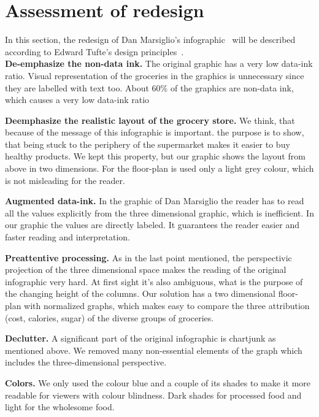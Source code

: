 \section{Assessment of redesign}

In this section, the redesign of Dan Marsiglio's
infographic~\cite{DanMarsigliotwo008} will be described according to Edward
Tufte's design principles~\cite{Tuftetwo001}.\\

\textbf{De-emphasize the non-data ink.} The original graphic has a very
low data-ink ratio. Visual representation of the groceries in the graphics
is unnecessary since they are labelled with text too. About 60\% of
the graphics are non-data ink, which causes a very low data-ink ratio

\textbf{Deemphasize the realistic layout of the grocery store.} We
think, that because of the message of this infographic is important. the
purpose is to show, that being stuck to the periphery of the supermarket
makes it easier to buy healthy products. We kept this property, but our
graphic shows the layout from above in two dimensions. For the floor-plan is
used only a light grey colour, which is not misleading for the reader.

\textbf{Augmented data-ink.} In the graphic of Dan Marsiglio the reader
has to read all the values explicitly from the three dimensional graphic, which
is inefficient. In our graphic the values are directly labeled. It
guarantees the reader easier and faster reading and interpretation.

\textbf{Preattentive processing.} As in the last point mentioned, the
perspectivic projection of the three dimensional space makes the reading of
the original infographic very hard. At first sight it's also ambiguous,
what is the purpose of the changing height of the columns. Our solution
has a two dimensional floor-plan with normalized graphs, which makes easy to
compare the three attribution (cost, calories, sugar) of the diverse groups of
groceries.

\textbf{Declutter.} A significant part of the original infographic is chartjunk
as mentioned above. We removed many non-essential elements of the graph which
includes the three-dimensional perspective. 

\textbf{Colors.} We only used the colour blue and a couple of its shades to make
it more readable for viewers with colour blindness. Dark shades for processed
food and light for the wholesome food.\\

